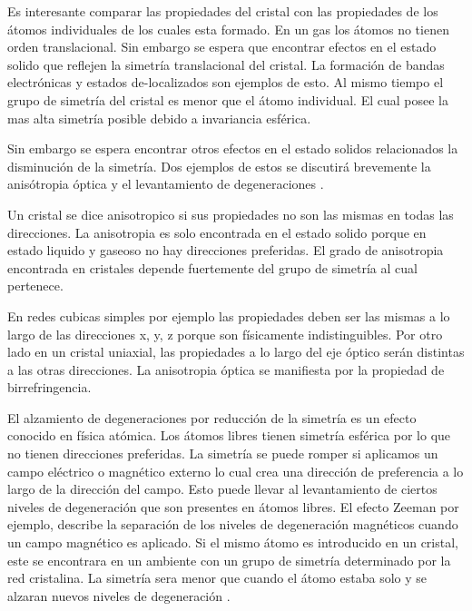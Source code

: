 \documentclass[a4paper,openright,12pt]{book}
\begin{document}
Es interesante comparar las propiedades del cristal con las propiedades de los átomos individuales de los cuales esta formado. En un gas los átomos no tienen orden translacional. Sin embargo se espera que encontrar efectos en el estado solido que reflejen la simetría translacional del cristal. La formación de bandas electrónicas y estados de-localizados son ejemplos de esto. Al mismo tiempo el grupo de simetría del cristal es menor que el átomo individual. El cual posee la mas alta simetría posible debido a invariancia esférica.

Sin embargo se espera encontrar otros efectos en el estado solidos relacionados la disminución de la simetría. Dos ejemplos de estos se discutirá brevemente la anisótropia óptica y el levantamiento de degeneraciones \cite{MarkFox}.

Un cristal se dice anisotropico si sus propiedades no son las mismas en todas las direcciones. La anisotropia es solo encontrada en el estado solido porque en estado liquido y gaseoso no hay direcciones preferidas. El grado de anisotropia encontrada en cristales depende fuertemente del grupo de simetría al cual pertenece.

En redes cubicas simples por ejemplo las propiedades deben ser las mismas a lo largo de las direcciones x, y, z porque son físicamente indistinguibles. Por otro lado en un cristal uniaxial, las propiedades a lo largo del eje óptico serán distintas a las otras direcciones. La anisotropia óptica se manifiesta por la propiedad de birrefringencia.

El alzamiento de degeneraciones por reducción de la simetría es un efecto conocido en física atómica. Los átomos libres tienen simetría esférica por lo que no tienen direcciones preferidas. La simetría se puede romper si aplicamos un campo eléctrico o magnético externo lo cual crea una dirección de preferencia a lo largo de la dirección del campo. Esto puede llevar al levantamiento de ciertos niveles de degeneración que son presentes en átomos libres. El efecto Zeeman por ejemplo, describe la separación de los niveles de degeneración magnéticos cuando un campo magnético es aplicado. Si el mismo átomo es introducido en un cristal, este se encontrara en un ambiente con un grupo de simetría determinado por la red cristalina. La simetría sera menor que cuando el átomo estaba solo y se alzaran nuevos niveles de degeneración \cite{MarkFox}.
\end{document}

